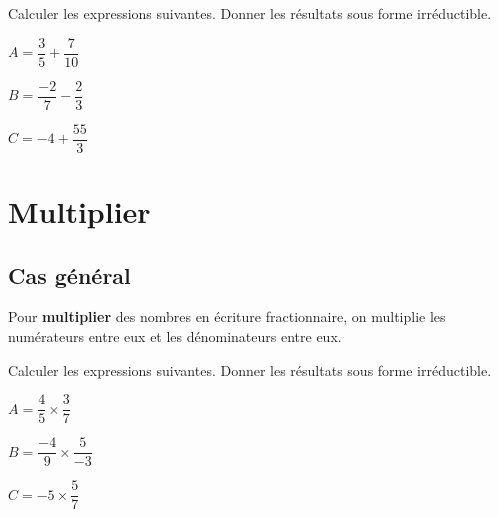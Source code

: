 \documentclass[a4paper]{book}
\begin{document}
    \begin{exemple} 
        Calculer les expressions suivantes. Donner les résultats sous forme irréductible.

        \begin{minipage}{0.24\linewidth}
            $A=\dfrac{3}{5}+\dfrac{7}{10}$

            \vspace{1.5cm}
        \end{minipage}
        \hfill\vline\hfill
        \begin{minipage}{0.24\linewidth}
            $B=\dfrac{-2}{7}-\dfrac{2}{3}$

            \vspace{1.5cm}
        \end{minipage}
        \hfill\vline\hfill
        \begin{minipage}{0.24\linewidth}
            $C=-4+\dfrac{55}{3}$

            \vspace{1.5cm}
        \end{minipage}
    \end{exemple}
    
    
\section{Multiplier}
\subsection{Cas général}
    
    \begin{definition}
        Pour \textbf{multiplier} des nombres en écriture fractionnaire, on multiplie les numérateurs entre eux et les dénominateurs entre eux.
    \end{definition}
    
    \begin{exemple} 
         Calculer les expressions suivantes. Donner les résultats sous forme irréductible.

        \begin{minipage}{0.3\linewidth}
            $A=\dfrac{4}{5}\times\dfrac{3}{7}$

            \vspace{1.5cm}
        \end{minipage}
        \hfill\vline\hfill
        \begin{minipage}{0.3\linewidth}
            $B=\dfrac{-4}{9}\times\dfrac{5}{-3}$

            \vspace{1.5cm}
        \end{minipage}
        \hfill\vline\hfill
        \begin{minipage}{0.3\linewidth}
            $C=-5\times\dfrac{5}{7}$

            \vspace{1.5cm}
        \end{minipage}
    \end{exemple}
    
\end{document}
